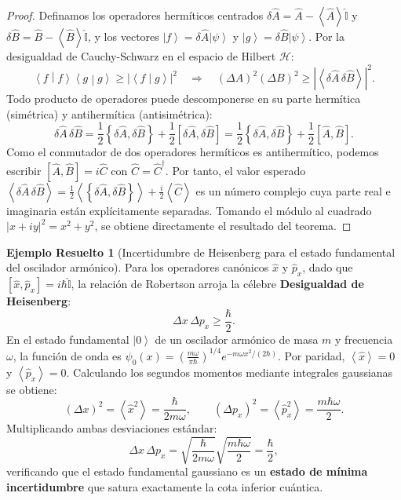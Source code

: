 \documentclass[11pt,a4paper,twoside]{report}
\theoremstyle{definition}
\newtheorem{ejemplo}{Ejemplo Resuelto}[chapter]
\theoremstyle{plain}
\theoremstyle{remark}
\newcommand{\ket}[1]{\left| #1 \right\rangle}
\newcommand{\braket}[2]{\left\langle #1 \middle| #2 \right\rangle}
\newcommand{\expval}[1]{\left\langle #1 \right\rangle}
\newcommand{\comm}[2]{\left[ #1, #2 \right]}
\newcommand{\acomm}[2]{\left\{ #1, #2 \right\}}
\newcommand{\Hil}{\mathcal{H}}
\newcommand{\op}[1]{\hat{#1}}
\newcommand{\ident}{\hat{\mathbb{I}}}
\begin{document}
\begin{proof}
Definamos los operadores hermíticos centrados $\delta\op{A} = \op{A} - \expval{\op{A}}\ident$ y $\delta\op{B} = \op{B} - \expval{\op{B}}\ident$, y los vectores $\ket{f} = \delta\op{A}\ket{\psi}$ y $\ket{g} = \delta\op{B}\ket{\psi}$. Por la desigualdad de Cauchy-Schwarz en el espacio de Hilbert $\Hil$:
\begin{equation}
    \braket{f}{f}\braket{g}{g} \ge |\braket{f}{g}|^2 \quad \Longrightarrow \quad (\Delta A)^2 (\Delta B)^2 \ge |\expval{\delta\op{A}\,\delta\op{B}}|^2.
\end{equation}
Todo producto de operadores puede descomponerse en su parte hermítica (simétrica) y antihermítica (antisimétrica):
\begin{equation}
    \delta\op{A}\,\delta\op{B} = \frac{1}{2}\acomm{\delta\op{A}}{\delta\op{B}} + \frac{1}{2}\comm{\delta\op{A}}{\delta\op{B}} = \frac{1}{2}\acomm{\delta\op{A}}{\delta\op{B}} + \frac{1}{2}\comm{\op{A}}{\op{B}}.
\end{equation}
Como el conmutador de dos operadores hermíticos es antihermítico, podemos escribir $\comm{\op{A}}{\op{B}} = i\op{C}$ con $\op{C} = \op{C}^\dagger$. Por tanto, el valor esperado $\expval{\delta\op{A}\,\delta\op{B}} = \frac{1}{2}\expval{\acomm{\delta\op{A}}{\delta\op{B}}} + \frac{i}{2}\expval{\op{C}}$ es un número complejo cuya parte real e imaginaria están explícitamente separadas. Tomando el módulo al cuadrado $|x + iy|^2 = x^2 + y^2$, se obtiene directamente el resultado del teorema.
\end{proof}

\begin{ejemplo}[Incertidumbre de Heisenberg para el estado fundamental del oscilador armónico]
Para los operadores canónicos $\op{x}$ y $\op{p}_x$, dado que $\comm{\op{x}}{\op{p}_x} = i\hbar\ident$, la relación de Robertson arroja la célebre \textbf{Desigualdad de Heisenberg}:
\begin{equation}
    \Delta x \, \Delta p_x \ge \frac{\hbar}{2}.
\end{equation}
En el estado fundamental $\ket{0}$ de un oscilador armónico de masa $m$ y frecuencia $\omega$, la función de onda es $\psi_0(x) = \left(\frac{m\omega}{\pi\hbar}\right)^{1/4} e^{-m\omega x^2/(2\hbar)}$. Por paridad, $\expval{\op{x}} = 0$ y $\expval{\op{p}_x} = 0$. Calculando los segundos momentos mediante integrales gaussianas se obtiene:
\begin{equation}
    (\Delta x)^2 = \expval{\op{x}^2} = \frac{\hbar}{2m\omega}, \qquad (\Delta p_x)^2 = \expval{\op{p}_x^2} = \frac{m\hbar\omega}{2}.
\end{equation}
Multiplicando ambas desviaciones estándar:
\begin{equation}
    \Delta x \, \Delta p_x = \sqrt{\frac{\hbar}{2m\omega}} \sqrt{\frac{m\hbar\omega}{2}} = \frac{\hbar}{2},
\end{equation}
verificando que el estado fundamental gaussiano es un \textbf{estado de mínima incertidumbre} que satura exactamente la cota inferior cuántica.
\end{ejemplo}
\end{document}
